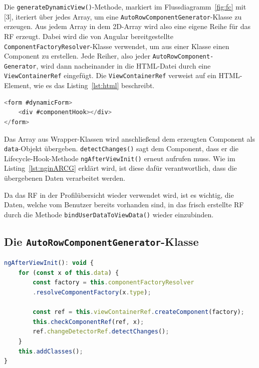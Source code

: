 Die \texttt{generateDynamicView()}-Methode, markiert im Flussdiagramm~\ref{fig:fc} mit [3], iteriert über jedes Array, um eine \texttt{AutoRowComponentGenerator}-Klasse zu erzeugen. Aus jedem Array in dem 2D-Array wird also eine eigene Reihe für das RF erzeugt. Dabei wird die von Angular bereitgestellte \texttt{ComponentFactoryResolver}-Klasse verwendet, um aus einer Klasse einen Component zu erstellen. 
Jede Reiher, also jeder \texttt{AutoRowComponent-\\Generator}, wird dann nacheinander in die HTML-Datei durch eine \texttt{ViewContainerRef} eingefügt. Die \texttt{ViewContainerRef} verweist auf ein HTML-Element, wie es das Listing~\ref{lst:html} beschreibt.

\begin{lstlisting}[caption={ViewContainerRef verweist auf \#componentHook}, language=JavaScript,label={lst:html}]
<form #dynamicForm>
	<div #componentHook></div>
</form>
\end{lstlisting}

Das Array aus Wrapper-Klassen wird anschließend dem erzeugten Component als \texttt{data}-Objekt übergeben. \texttt{detectChanges()} sagt dem Component, dass er die Lifecycle-Hook-Methode \texttt{ngAfterViewInit()} erneut aufrufen muss. Wie im Listing~\ref{lst:nginARCG} erklärt wird, ist diese dafür verantwortlich, dass die übergebenen Daten verarbeitet werden.

Da das RF in der Profilübersicht wieder verwendet wird, ist es wichtig, die Daten, welche vom Benutzer bereits vorhanden sind, in das frisch erstellte RF durch die Methode \texttt{bindUserDataToViewData()} wieder einzubinden.

\subsection{Die \texttt{AutoRowComponentGenerator}-Klasse}

\begin{lstlisting}[caption={Die \texttt{ngAfterViewInit()}-Methode der \texttt{AutoRowComponentGenerator}-Klasse}, language=JavaScript,label={lst:nginARCG}]
ngAfterViewInit(): void {
	for (const x of this.data) {
		const factory = this.componentFactoryResolver
		.resolveComponentFactory(x.type);
		
		const ref = this.viewContainerRef.createComponent(factory);
		this.checkComponentRef(ref, x);
		ref.changeDetectorRef.detectChanges();
	}
	this.addClasses();
}
\end{lstlisting}

